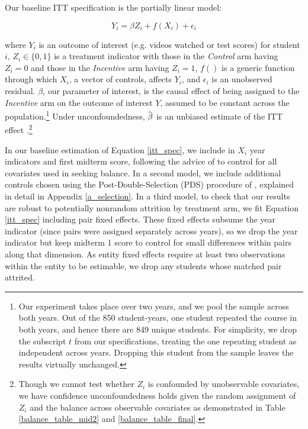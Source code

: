 \documentclass[12pt]{article}
\newcommand\wh[1]{\hstretch{2}{\hat{\hstretch{.5}{#1}}}}
\begin{document}
Our baseline ITT specification is the partially linear model:

\begin{equation} \label{itt_spec}
	Y_i = \beta Z_i + f(X_i) + \epsilon_i
\end{equation}

where $Y_i$ is an outcome of interest (e.g. videos watched or test scores) for student $i$, $Z_i \in \{0,1\}$ is a treatment indicator with those in the \textit{Control} arm having $Z_i=0$ and those in the \textit{Incentive} arm having $Z_i=1$, $f()$ is a generic function through which $X_i$, a vector of controls, affects $Y_i$, and $\epsilon_i$ is an unobserved residual. $\beta$, our parameter of interest, is the causal effect of being assigned to the \textit{Incentive} arm on the outcome of interest $Y$, assumed to be constant across the population.\footnote{Our experiment takes place over two years, and we pool the sample across both years. Out of the 850 student-years, one student repeated the course in both years, and hence there are 849 unique students. For simplicity, we drop the subscript $t$ from our specifications, treating the one repeating student as independent across years. Dropping this student from the sample leaves the results virtually unchanged.} Under unconfoundedness, $\wh{\beta}$ is an unbiased estimate of the ITT effect \parencite{ir2015}.\footnote{Though we cannot test whether $Z_i$ is confounded by unobservable covariates, we have confidence unconfoundedness holds given the random assignment of $Z_i$ and the balance across observable covariates as demonstrated in Table \ref{balance_table_mid2} and \ref{balance_table_final}.}

In our baseline estimation of Equation \ref{itt_spec}, we include in $X_i$ year indicators and first midterm score, following the advice of \textcite{bm2009} to control for all covariates used in seeking balance. In a second model, we include additional controls chosen using the Post-Double-Selection (PDS) procedure of \textcite{bch2014a}, explained in detail in Appendix \ref{a_selection}. In a third model, to check that our results are robust to potentially nonrandom attrition by treatment arm, we fit Equation \ref{itt_spec} including pair fixed effects. These fixed effects subsume the year indicator (since pairs were assigned separately across years), so we drop the year indicator but keep midterm 1 score to control for small differences within pairs along that dimension. As entity fixed effects require at least two observations within the entity to be estimable, we drop any students whose matched pair attrited.
\end{document}
